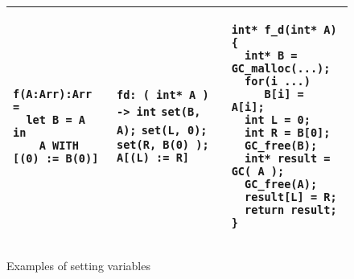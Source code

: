 \documentclass[12pt,a4paper]{article}
\newcommand{\cl}[1]{\texttt{#1}}
\begin{document}
\begin{figure}[!ht]
\begin{tabular}{|p{5.2cm}|p{5.8cm}|p{6cm}|}
\begin{lstlisting}
f(A:Arr):Arr =
  let B = A in
    A WITH [(0) := B(0)]
\end{lstlisting} &
\cl{fd: ( int* A ) -> int} \newline
\cl{set(B, A);} \newline
\cl{set(L, 0);} \newline
\cl{set(R, B(0) );} \newline
\cl{A[(L) := R]} &
\begin{lstlisting}
int* f_d(int* A) {
  int* B = GC_malloc(...);
  for(i ...)
     B[i] = A[i];
  int L = 0;
  int R = B[0];
  GC_free(B);
  int* result = GC( A );
  GC_free(A);
  result[L] = R;
  return result;
}
\end{lstlisting} \\ \hline
\end{tabular}
\caption{Examples of setting variables}
\end{figure}
\end{document}
